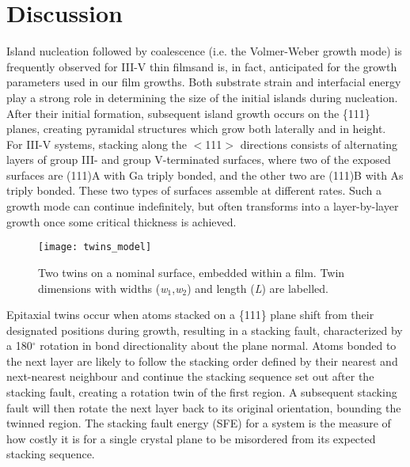 \section{Discussion}
Island nucleation followed by coalescence (i.e. the Volmer-Weber growth mode) is frequently observed for III-V thin films\cite{Ernst1989,Fang1990,Kim2010,Akahane2004}and is, in fact, anticipated for the growth parameters used in our film growths. Both substrate strain and interfacial energy play a strong role in determining the size of the initial islands during nucleation. After their initial formation, subsequent island growth occurs on the \{111\} planes, creating pyramidal structures which grow both laterally and in height. For III-V systems, stacking along the $<$111$>$ directions consists of alternating layers of group III- and group V-terminated surfaces, where two of the exposed surfaces are (111)A with Ga triply bonded, and the other two are (111)B with As triply bonded. These two types of surfaces assemble at different rates. Such a growth mode can continue indefinitely, but often transforms into a layer-by-layer growth once some critical thickness is achieved\cite{Tersoff1994}.
\begin{figure}
    \centering
    \texttt{[image: twins\_model]}
    \caption{\label{fig:twins_model}Two twins on a nominal surface, embedded within a film. Twin dimensions with widths (\textit{w}$_1$,\textit{w}$_2$) and length (\textit{L}) are labelled.}	
\end{figure}
Epitaxial twins occur when atoms stacked on a \{111\} plane shift from their designated positions during growth, resulting in a stacking fault, characterized by a 180$^\circ$ rotation in bond directionality about the plane normal. Atoms bonded to the next layer are likely to follow the stacking order defined by their nearest and next-nearest neighbour and continue the stacking sequence set out after the stacking fault, creating a rotation twin of the first region. A subsequent stacking fault will then rotate the next layer back to its original orientation, bounding the twinned region. The stacking fault energy (SFE) for a system is the measure of how costly it is for a single crystal plane to be misordered from its expected stacking sequence.

